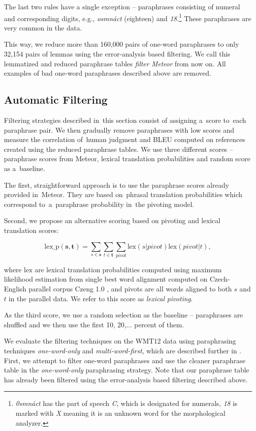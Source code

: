The last two rules have a single exception -- paraphrases consisting of numeral and corresponding digits, e.g., \textit{osmnáct} (eighteen) and \textit{18}.\footnote{
\textit{0smnáct} has the part of speech \textit{C}, which is designated for numerals, \textit{18} is marked with \textit{X} meaning it is an unknown word for the morphological analyzer.} 
These paraphrases are very common in the data. 

This way, we reduce more than 160,000 pairs of one-word paraphrases to only 32,154 pairs of lemmas using the error-analysis based filtering. 
We call this lemmatized and reduced paraphrase tables  \emph{filter Meteor} from now on.
All examples of bad one-word paraphrases described above are removed.


\subsection{Automatic Filtering}
Filtering strategies described in~this section consist of assigning a~score to~each paraphrase pair. 
We then gradually remove paraphrases with low scores and measure the correlation of~human judgment and BLEU computed on references created using the reduced paraphrase tables. 
We use three different scores -- paraphrase scores from Meteor, lexical translation probabilities and random score as a~baseline.

The first, straightforward approach is to use the paraphrase scores already provided in~Meteor. 
They are based on~phrasal translation probabilities which correspond to~a~paraphrase probability in~the pivoting model.

Second, we propose an alternative scoring based on pivoting and lexical translation scores:

$$\text{lex\_p}(\mathbf{s},\mathbf{t}) = \sum_{s \in \mathbf{s}}\sum_{t \in\mathbf{t}}\sum_{pivot}\text{lex}(s|pivot)\text{lex}(pivot|t),$$

where $\text{lex}$ are lexical translation probabilities computed using maximum likelihood estimation from single best word alignment computed on Czech-English parallel corpus Czeng 1.0 \citep{czeng10:lrec2012}, and pivots are all words aligned to both $s$ and $t$ in the parallel data. 
We refer to this score as \emph{lexical pivoting}.

As the third score, we use a random selection as the baseline -- paraphrases are shuffled and we then use the first 10, 20,$\ldots$ percent of them.

We evaluate the filtering techniques on the WMT12 data using paraphrasing techniques \emph{one-word-only} and  \emph{multi-word-first}, which are described further in .
First, we attempt to filter one-word paraphrases and use the cleaner paraphrase table in the \emph{one-word-only} paraphrasing strategy. 
Note that our paraphrase table has already been filtered using the error-analysis based filtering described above.

